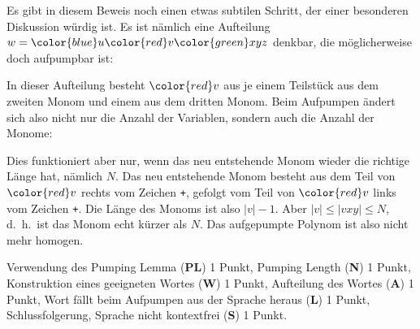 \begin{diskussion}
Es gibt in diesem Beweis noch einen etwas subtilen Schritt, der einer
besonderen Diskussion würdig ist. Es ist nämlich eine Aufteilung
$w={\color{blue}u}{\color{red}v}{\color{green}x}yz$ denkbar,
die möglicherweise doch aufpumpbar ist:
\begin{center}
\end{center}
In dieser Aufteilung besteht $\color{red}v$ aus je einem Teilstück
aus dem zweiten Monom und einem aus dem dritten Monom. Beim
Aufpumpen ändert sich also nicht nur die Anzahl der
Variablen, sondern auch die Anzahl der Monome:
\begin{center}
\end{center}
Dies funktioniert
aber nur, wenn das neu entstehende Monom wieder die richtige
Länge hat, nämlich $N$. Das neu entstehende Monom besteht
aus dem Teil von $\color{red}v$ rechts vom Zeichen \texttt{+},
gefolgt vom Teil von $\color{red}v$ links vom Zeichen \texttt{+}.
Die Länge des Monoms ist also $|v|-1$. Aber $|v|\le |vxy|\le N$,
d.~h.~ist das Monom echt kürzer als $N$. Das aufgepumpte Polynom ist
also nicht mehr homogen.
\end{diskussion}

\begin{bewertung}
Verwendung des Pumping Lemma ({\bf PL}) 1 Punkt,
Pumping Length ({\bf N}) 1 Punkt,
Konstruktion eines geeigneten Wortes ({\bf W}) 1 Punkt,
Aufteilung des Wortes ({\bf A}) 1 Punkt,
Wort fällt beim Aufpumpen aus der Sprache heraus ({\bf L}) 1 Punkt,
Schlussfolgerung, Sprache nicht kontextfrei ({\bf S}) 1 Punkt.
\end{bewertung}

